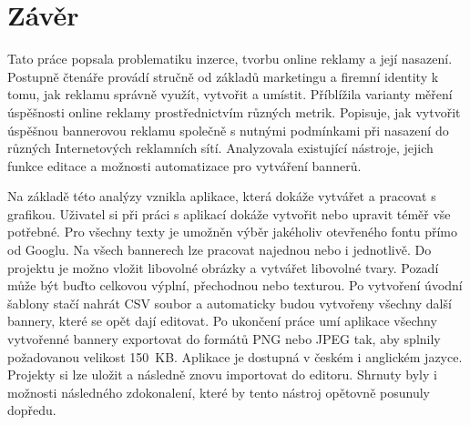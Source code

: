 \chapter{Závěr}
\label{chap:conclusion}
Tato práce popsala problematiku inzerce, tvorbu online reklamy a její nasazení. Postupně čtenáře provádí stručně od základů marketingu a firemní identity k tomu, jak
reklamu správně využít, vytvořit a umístit. Příblížila varianty měření úspěšnosti online reklamy prostřednictvím různých metrik. Popisuje, jak vytvořit úspěšnou bannerovou reklamu
společně s nutnými podmínkami při nasazení do různých Internetových reklamních sítí. 
Analyzovala existující nástroje, jejich funkce editace a možnosti automatizace pro vytváření bannerů.

Na základě této analýzy vznikla aplikace, která dokáže vytvářet a pracovat s grafikou. Uživatel si při práci s aplikací dokáže vytvořit nebo upravit téměř vše potřebné.
Pro všechny texty je umožněn výběr jakéholiv otevřeného fontu přímo od Googlu. Na všech bannerech lze pracovat najednou nebo i jednotlivě. Do projektu je možno vložit
libovolné obrázky a vytvářet libovolné tvary. Pozadí může být buďto celkovou výplní, přechodnou nebo texturou. Po vytvoření úvodní šablony stačí nahrát 
CSV soubor a automaticky budou vytvořeny všechny další bannery, které se opět dají editovat. Po ukončení práce umí aplikace všechny vytvořenné bannery exportovat do formátů PNG nebo JPEG tak,
aby splnily požadovanou velikost 150~KB. Aplikace je dostupná v českém i anglickém jazyce. Projekty si lze uložit a následně znovu importovat do editoru.
Shrnuty byly i možnosti následného zdokonalení, které by tento nástroj opětovně posunuly dopředu. 


\endinput